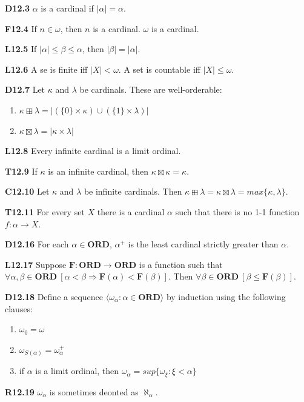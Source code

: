 \documentclass[10pt, landscape]{article}
\begin{document}
\begin{multicols*}{3}
\textbf{D12.3} $\alpha$ is a cardinal if $|\alpha|=\alpha$.

\textbf{F12.4} If $n\in\omega$, then $n$ is a cardinal. $\omega$ is a cardinal.

\textbf{L12.5} If $|\alpha|\leq\beta\leq\alpha$, then $|\beta|=|\alpha|$.

\textbf{L12.6} A se is finite iff $|X|<\omega$. A set is countable iff $|X|\leq\omega$.

\textbf{D12.7} Let $\kappa$ and $\lambda$ be cardinals. These are well-orderable:
\begin{enumerate}
    \item $\kappa\boxplus\lambda=|(\{0\}\times\kappa)\cup(\{1\}\times\lambda)|$
    \item $\kappa\boxtimes\lambda=|\kappa\times\lambda|$
\end{enumerate}

\textbf{L12.8} Every infinite cardinal is a limit ordinal.

\textbf{T12.9} If $\kappa$ is an infinite cardinal, then $\kappa\boxtimes\kappa=\kappa$.

\textbf{C12.10} Let $\kappa$ and $\lambda$ be infinite cardinals. Then $\kappa\boxplus\lambda=\kappa\boxtimes\lambda=max\{\kappa,\lambda\}$.

\textbf{T12.11} For every set $X$ there is a cardinal $\alpha$ such that there is no 1-1 function $f:\alpha\rightarrow X$.

\textbf{D12.16} For each $\alpha\in\mathbf{ORD}$, $\alpha^+$ is the least cardinal strictly greater than $\alpha$.

\textbf{L12.17} Suppose $\mathbf{F:ORD\rightarrow ORD}$ is a function such that $\forall\alpha,\beta\in\mathbf{ORD}\ [\alpha<\beta\Rightarrow\mathbf{F}(\alpha)<\mathbf{F}(\beta)]$. Then $\forall\beta\in\mathbf{ORD}\ [\beta\leq\mathbf{F}(\beta)]$.

\textbf{D12.18} Define a sequence $\langle \omega_\alpha: \alpha \in \mathbf{ORD}\rangle$ by induction using the following clauses:
\begin{enumerate}
    \item $\omega_0=\omega$
    \item $\omega_{S(\alpha)}=\omega_\alpha^+$
    \item if $\alpha$ is a limit ordinal, then $\omega_\alpha=sup\{\omega_\xi:\xi<\alpha\}$
\end{enumerate}

\textbf{R12.19} $\omega_\alpha$ is sometimes deonted as $\aleph_\alpha$.


\end{multicols*}
\end{document}
